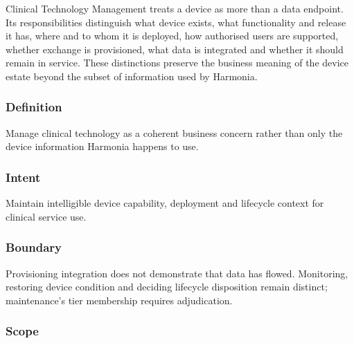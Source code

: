Clinical Technology Management treats a device as more than a data endpoint. Its responsibilities distinguish what device exists, what functionality and release it has, where and to whom it is deployed, how authorised users are supported, whether exchange is provisioned, what data is integrated and whether it should remain in service. These distinctions preserve the business meaning of the device estate beyond the subset of information used by Harmonia.

\subsubsection*{Definition}

Manage clinical technology as a coherent business concern rather than only the device information Harmonia happens to use.

\subsubsection*{Intent}

Maintain intelligible device capability, deployment and lifecycle context for clinical service use.

\subsubsection*{Boundary}

Provisioning integration does not demonstrate that data has flowed. Monitoring, restoring device condition and deciding lifecycle disposition remain distinct; maintenance's tier membership requires adjudication.

\subsubsection*{Scope}
